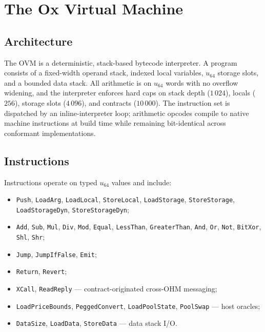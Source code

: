 \documentclass[11pt,a4paper]{article}
\theoremstyle{definition}
\newcommand{\ohm}{\textsf{OH\scriptsize M}}\newcommand{\evk}{\textsf{EVK}}
\newcommand{\ovm}{\textsf{OVM}}
\begin{document}
\section{The Ox Virtual Machine}
\label{sec:ovm}

\subsection{Architecture}

The \ovm{} is a deterministic, stack-based bytecode interpreter.  A program
consists of a fixed-width operand stack, indexed local variables, $u_64$ storage
slots, and a bounded data stack.  All arithmetic is on $u_{64}$ words with no
overflow widening, and the interpreter enforces hard caps on stack depth
($1\,024$), locals ($256$), storage slots ($4\,096$), and contracts
($10\,000$).  The instruction set is dispatched by an inline-interpreter loop;
arithmetic opcodes compile to native machine instructions at build time while
remaining bit-identical across conformant implementations.

\subsection{Instructions}

Instructions operate on typed $u_{64}$ values and include:
\begin{itemize}[leftmargin=2em]
  \item \texttt{Push}, \texttt{LoadArg}, \texttt{LoadLocal}, \texttt{StoreLocal},
    \texttt{LoadStorage}, \texttt{StoreStorage}, \texttt{LoadStorageDyn},
    \texttt{StoreStorageDyn};
  \item \texttt{Add}, \texttt{Sub}, \texttt{Mul}, \texttt{Div}, \texttt{Mod},
    \texttt{Equal}, \texttt{LessThan}, \texttt{GreaterThan}, \texttt{And},
    \texttt{Or}, \texttt{Not}, \texttt{BitXor}, \texttt{Shl}, \texttt{Shr};
  \item \texttt{Jump}, \texttt{JumpIfFalse}, \texttt{Emit};
  \item \texttt{Return}, \texttt{Revert};
  \item \texttt{XCall}, \texttt{ReadReply} --- contract-originated cross-\ohm{} messaging;
  \item \texttt{LoadPriceBounds}, \texttt{PeggedConvert},
    \texttt{LoadPoolState}, \texttt{PoolSwap} --- host oracles;
  \item \texttt{DataSize}, \texttt{LoadData}, \texttt{StoreData} --- data stack I/O.
\end{itemize}
\end{document}
